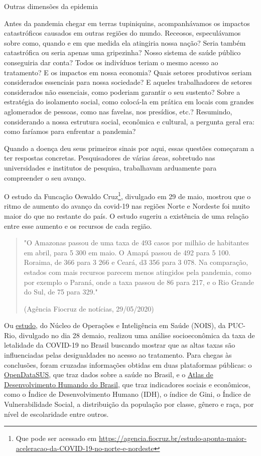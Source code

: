 \begin{example}{Outras dimensões da epidemia}
	
Antes da pandemia chegar em terras tupiniquins, acompanhávamos os impactos catastróficos causados em outras regiões do mundo. Receosos, especulávamos sobre como, quando e em que medida ela atingiria nossa nação? Seria também catastrófica ou seria apenas uma gripezinha? Nosso sistema de saúde público conseguiria dar conta? Todos os indivíduos teriam o mesmo acesso ao tratamento? E os impactos em nossa economia? Quais setores produtivos seriam considerados essenciais para nossa sociedade? E aqueles trabalhadores de setores considerados não essenciais, como poderiam garantir o seu sustento? Sobre a estratégia do isolamento social, como colocá-la em prática em locais com grandes aglomerados de pessoas, como nas favelas, nos presídios, etc.? Resumindo, considerando a nossa estrutura social, econômica e cultural, a pergunta geral era: como faríamos para enfrentar a pandemia?

Quando a doença deu seus primeiros sinais por aqui, essas questões começaram a ter respostas concretas. Pesquisadores de várias áreas, sobretudo nas universidades e institutos de pesquisa, trabalhavam arduamente para compreender o seu avanço.

O estudo da Funcação Oswaldo Cruz\footnote{Que pode ser acessado em \url{  https://agencia.fiocruz.br/estudo-aponta-maior-aceleracao-da-COVID-19-no-norte-e-nordeste}}, divulgado em 29 de maio, mostrou que o ritmo de aumento do avanço da covid-19 nas regiões Norte e Nordeste foi muito maior do que no restante do país. O estudo sugeriu a existência de uma relação entre esse aumento e os recursos de cada região.

\begin{quote}
"O Amazonas passou de uma taxa de 493 casos por milhão de habitantes em abril, para 5 300 em maio. O Amapá passou de 492 para 5 100. Roraima, de 366 para 3 266 e Ceará, d3 356 para 3 078. Na comparação, estados com mais recursos parecem menos atingidos pela pandemia, como por exemplo o Paraná, onde a taxa passou de 86 para 217, e o Rio Grande do Sul, de 75 para 329."
\flushleft

(Agência Fiocruz de notícias, 29/05/2020)
\end{quote}

Ou \href{https://drive.google.com/file/d/1tSU7mV4OPnLRFMMY47JIXZgzkklvkydO/view }{estudo}, do Núcleo de Operações e Inteligência em Saúde (NOIS), da PUC-Rio, divulgado no dia 28 demaio, realizou uma análise socioeconômica da taxa de letalidade da COVID-19 no Brasil buscando mostrar que as altas taxas são influenciadas pelas desigualdades no acesso ao tratamento. Para chegas às conclusões, foram cruzadas informações obtidas em duas plataformas públicas: o \href{https://opendatasus.saude.gov.br/}{OpenDataSUS}, que traz dados sobre a saúde no Brasil, e o \href{http://atlasbrasil.org.br}{Atlas de Desenvolvimento Humando do Brasil}, que traz indicadores sociais e econômicos, como o Índice de Desenvolvimento Humano (IDH), o índice de Gini, o Índice de Vulnerabilidade Social, a distribuição da população por classe, gênero e raça, por nível de escolaridade entre outros.


\end{example}
